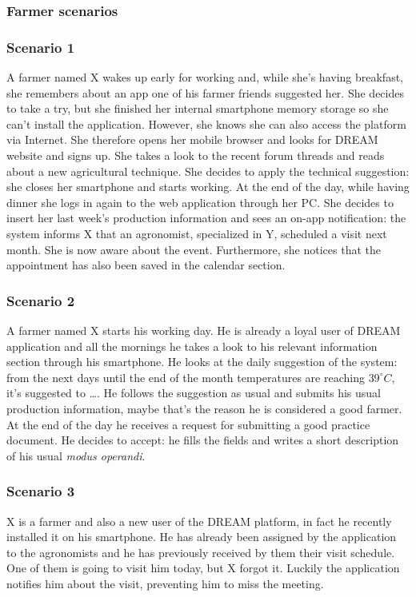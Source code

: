 \subsubsection*{Farmer scenarios}

\subsubsection*{Scenario 1}
A farmer named X wakes up early for working and, while she's having breakfast, she remembers about an app one of his farmer friends suggested her. She decides to take a try, but she finished her internal smartphone memory storage so she can't install the application. However, she knows she can also access the platform via Internet. She therefore opens her mobile browser and looks for DREAM website and signs up. She takes a look to the recent forum threads and reads about a new agricultural technique. She decides to apply the technical suggestion: she closes her smartphone and starts working. At the end of the day, while having dinner she logs in again to the web application through her PC. She decides to insert her last week's production information and sees an on-app notification: the system informs X that an agronomist, specialized in Y, scheduled a visit next month. She is now aware about the event. Furthermore, she notices that the appointment has also been saved in the calendar section.

\subsubsection*{Scenario 2}
A farmer named X starts his working day. He is already a loyal user of DREAM application and all the mornings he takes a look to his relevant information section through his smartphone. He looks at the daily suggestion of the system: from the next days until the end of the month temperatures are reaching $39^\circ C$, it's suggested to \ldots. He follows the suggestion as usual and submits his usual production information, maybe that's the reason he is considered a good farmer. At the end of the day he receives a request for submitting a good practice document. He decides to accept: he fills the fields and writes a short description of his usual \textit{modus operandi}.

\subsubsection*{Scenario 3}
X is a farmer and also a new user of the DREAM platform, in fact he recently installed it on his smartphone. He has already been assigned by the application to the agronomists and he has previously received by them their visit schedule. One of them is going to visit him today, but X forgot it. Luckily the application notifies him about the visit, preventing him to miss the meeting.

